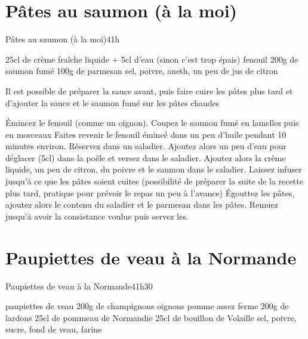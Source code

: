 {\section{Pâtes au saumon (à la moi)}
\begin{recette}{Pâtes au saumon (à la moi)}{4}{1h}{}
\begin{ingredients}
\ingredient 25cl de crème fraîche liquide + 5cl d'eau (sinon c'est trop épais)
 fenouil
\ingredient 200g de saumon fumé
\ingredient 100g de parmesan
\ingredient sel, poivre, aneth, un peu de jus de citron
\end{ingredients}

\begin{remarque}
Il est possible de préparer la sauce avant, puis faire cuire les pâtes plus tard et d'ajouter la sauce et le saumon fumé sur les pâtes chaudes
\end{remarque}


\begin{preparation}
\etape Émincez le fenouil (comme un oignon). Coupez le saumon fumé en lamelles puis en morceaux
\etape Faites revenir le fenouil émincé dans un peu d'huile pendant 10 minutes environ.
\etape Réservez dans un saladier. 
\etape Ajoutez alors un peu d'eau pour déglacer (5cl) dans la poële et versez dans le saladier. 
\etape Ajoutez alors la crème liquide, un peu de citron, du poivre et le saumon dans le saladier. 
\etape Laissez infuser jusqu'à ce que les pâtes soient cuites (possibilité de préparer la suite de la recette plus tard, pratique pour prévoir le repas un peu à l'avance)
\etape Égouttez les pâtes, ajoutez alors le contenu du saladier et le parmesan dans les pâtes. 
\etape Remuez jusqu'à avoir la consistance voulue puis servez les.
\end{preparation}
\end{recette}


\section{Paupiettes de veau à la Normande}
\begin{recette}{Paupiettes de veau à la Normande}{4}{1h30}{}
\begin{ingredients}
 paupiettes de veau
\ingredient 200g de champignons
 oignons
 pomme assez ferme
\ingredient 200g de lardons
\ingredient 25cl de pommeau de Normandie
\ingredient 25cl de bouillon de Volaille
\ingredient sel, poivre, sucre, fond de veau, farine
\end{ingredients}


\end{recette}}
